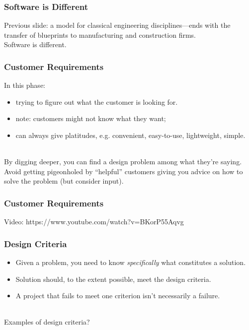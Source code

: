 \begin{frame}
\frametitle{Software is Different}

 
\begin{changemargin}{1cm}
Previous slide: a model for classical engineering disciplines---ends with
the transfer of blueprints to manufacturing and construction
firms. \\[1em]
\Large
Software is different.
\end{changemargin}

\end{frame}

\begin{frame}
\frametitle{Customer Requirements}

\begin{changemargin}{1cm}
In this phase:
\begin{itemize}
\item trying to figure out what the
customer is looking for.
\item note: customers might not know what they want;
\item can always give platitudes, e.g. convenient, easy-to-use, lightweight, simple.
\end{itemize}
~\\
By digging deeper, you can find a design problem among what they're
saying.\\[1em]

Avoid getting pigeonholed by ``helpful'' customers giving you advice on how
to solve the problem (but consider input).
\end{changemargin}

\end{frame}


\begin{frame}
\frametitle{Customer Requirements}

\begin{changemargin}{1cm}

Video:  https://www.youtube.com/watch?v=BKorP55Aqvg

\end{changemargin}

\end{frame}

\begin{frame}
\frametitle{Design Criteria}

\begin{changemargin}{1cm}
\begin{itemize}
\item Given a problem, you need to know
\emph{specifically} what constitutes a solution. 

\item Solution should, to the extent possible, meet the design criteria.

\item A project that fails to meet one criterion isn't necessarily a failure.
\end{itemize}
~\\

\alert{Examples of design criteria?}
\end{changemargin}

\end{frame}

